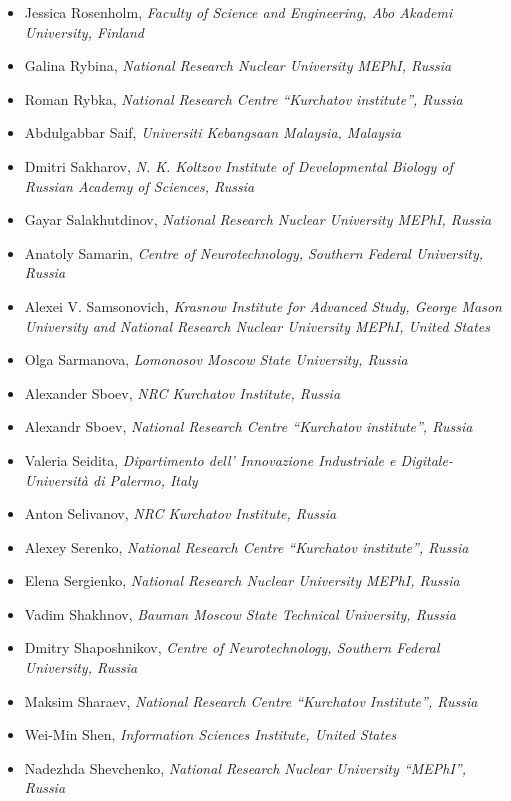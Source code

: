 \documentclass[10pt,fleqn,openany]{book} %
\begin{document}
\begin{itemize}
		\item Jessica Rosenholm, \textit{Faculty of Science and Engineering, Abo Akademi University, Finland}
		\item Galina Rybina, \textit{National Research Nuclear University MEPhI, Russia}
		\item Roman Rybka, \textit{National Research Centre ``Kurchatov institute'', Russia}
		\item Abdulgabbar Saif, \textit{Universiti Kebangsaan Malaysia, Malaysia}
		\item Dmitri Sakharov, \textit{N. K. Koltzov Institute of Developmental Biology of Russian Academy of Sciences, Russia}
		\item Gayar Salakhutdinov, \textit{National Research Nuclear University MEPhI, Russia}
		\item Anatoly Samarin, \textit{Centre of Neurotechnology, Southern Federal University, Russia}
		\item Alexei V. Samsonovich, \textit{Krasnow Institute for Advanced Study, George Mason University and National Research Nuclear University MEPhI, United States}
		\item Olga Sarmanova, \textit{Lomonosov Moscow State University, Russia}
		\item Alexander Sboev, \textit{NRC Kurchatov Institute, Russia}
		\item Alexandr Sboev, \textit{National Research Centre ``Kurchatov institute'', Russia}
		\item Valeria Seidita, \textit{Dipartimento dell' Innovazione Industriale e Digitale-Università di Palermo, Italy}
		\item Anton Selivanov, \textit{NRC Kurchatov Institute, Russia}
		\item Alexey Serenko, \textit{National Research Centre ``Kurchatov institute'', Russia}
		\item Elena Sergienko, \textit{National Research Nuclear University MEPhI, Russia}
		\item Vadim Shakhnov, \textit{Bauman Moscow State Technical University, Russia}
		\item Dmitry Shaposhnikov, \textit{Centre of Neurotechnology, Southern Federal University, Russia}
		\item Maksim Sharaev, \textit{National Research Centre ``Kurchatov Institute'', Russia}
		\item Wei-Min Shen, \textit{Information Sciences Institute, United States}
		\item Nadezhda Shevchenko, \textit{National Research Nuclear University ``MEPhI'', Russia}

\end{itemize}
\end{document}

